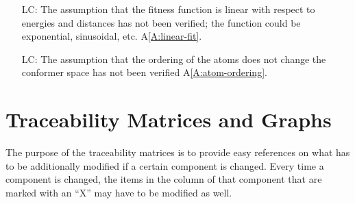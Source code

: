 \documentclass[12pt]{article}
\newcommand{\aref}[1]{A\ref{#1}}
\newcounter{lcnum} %
\begin{document}
\noindent \begin{itemize}

\item[LC\refstepcounter{lcnum}\thelcnum\label{LC_linear-fit}:] The assumption 
that the fitness function is linear with respect to energies and distances has 
not been verified; the function could be exponential, sinusoidal, etc.
\aref{A:linear-fit}. 

\item[LC\refstepcounter{lcnum}\thelcnum\label{LC_indep-ordering}:] The 
assumption that the ordering of the atoms does not change the conformer space 
has not been verified \aref{A:atom-ordering}.

\end{itemize}

\section{Traceability Matrices and Graphs}

The purpose of the traceability matrices is to provide easy references on what
has to be additionally modified if a certain component is changed.  Every time a
component is changed, the items in the column of that component that are marked
with an ``X'' may have to be modified as well. 



\end{document}
